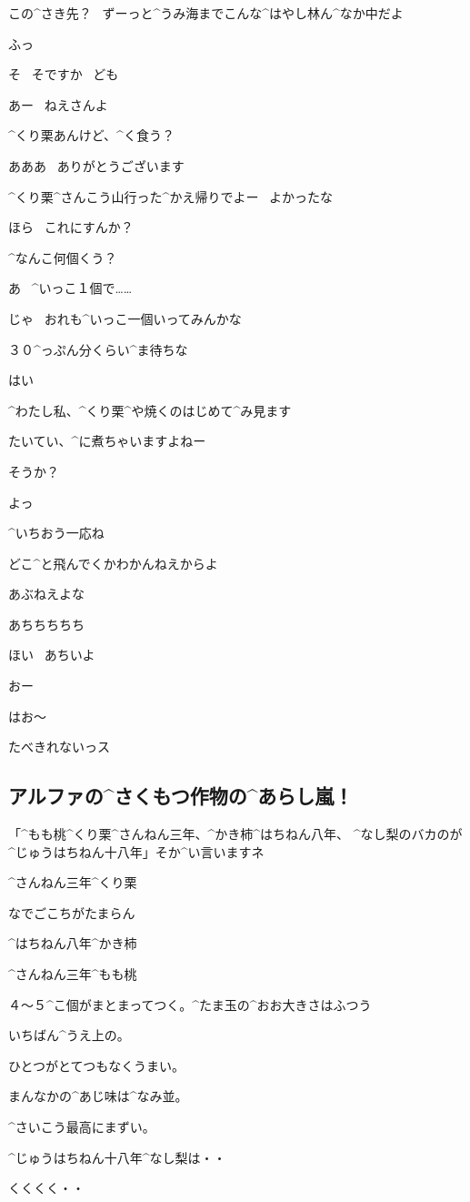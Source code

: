 \page[148]
\Person この^{さき}{先}？
\ ずーっと^{うみ}{海}までこんな^{はやし}{林}ん^{なか}{中}だよ

\Alpha ふっ

\Alpha そ
\ そですか
\ ども

\Person あー
\ ねえさんよ

\Person ^{くり}{栗}あんけど、^{く}{食}う？

\Alpha あああ
\ ありがとうございます

\page[149]
\Person ^{くり}{栗}^{さんこう}{山行}った^{かえ}{帰}りでよー
\ よかったな

\Person ほら
\ これにすんか？

\Person ^{なんこ}{何個}くう？

\Alpha あ
\ ^{いっこ}{１個}で……

\page[150]
\Person じゃ
\ おれも^{いっこ}{一個}いってみんかな

\Person ３０^{っぷん}{分}くらい^{ま}{待}ちな

\Alpha はい

\Alpha ^{わたし}{私}、^{くり}{栗}^{や}{焼}くのはじめて^{み}{見}ます

\Alpha たいてい、^{に}{煮}ちゃいますよねー

\Person そうか？

\page[151]
\Person よっ

\Person ^{いちおう}{一応}ね

\page[154]
\Person どこ^{と}{飛}んでくかわかんねえからよ

\Person あぶねえよな

\Person あちちちちち

\Person ほい
\ あちいよ

\Alpha おー

\Alpha はお〜

\page[157]
\Sign たべきれないっス


\subsection{アルファの^{さくもつ}{作物}の^{あらし}{嵐}！}
\Alpha 「^{もも}{桃}^{くり}{栗}^{さんねん}{三年}、^{かき}{柿}^{はちねん}{八年}、
  ^{なし}{梨}のバカのが^{じゅうはちねん}{十八年}」そか^{い}{言}いますネ

\Sign ^{さんねん}{三年}^{くり}{栗}

\Alpha なでごこちがたまらん

\Sign ^{はちねん}{八年}^{かき}{柿}

\Sign ^{さんねん}{三年}^{もも}{桃}

\Alpha ４〜５^{こ}{個}がまとまってつく。^{たま}{玉}の^{おお}{大}きさはふつう

\Alpha いちばん^{うえ}{上}の。

\Alpha ひとつがとてつもなくうまい。

\Alpha まんなかの^{あじ}{味}は^{なみ}{並}。

\Alpha ^{さいこう}{最高}にまずい。

\Sign ^{じゅうはちねん}{十八年}^{なし}{梨}は・・

\Alpha くくくく・・
